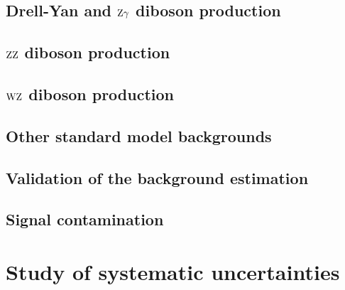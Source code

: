 \subsection{Drell-Yan and $\mathrm{Z}\gamma$ diboson production}
\subsection{$\mathrm{Z}\mathrm{Z}$ diboson production}
\subsection{$\mathrm{W}\mathrm{Z}$ diboson production}
\subsection{Other standard model backgrounds}
\subsection{Validation of the background estimation}\label{sec:Validation}
\subsection{Signal contamination}
\section{Study of systematic uncertainties}\label{sec:Syst}
